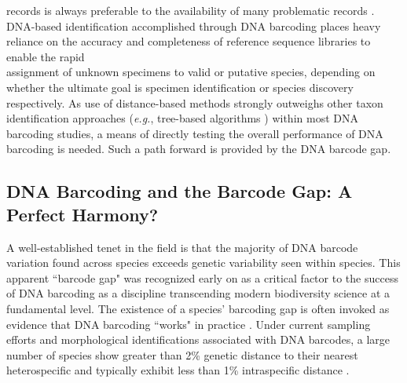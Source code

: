 records is always preferable to the availability of many problematic records \cite{collins2014known}. \\ DNA-based identification accomplished through DNA barcoding places heavy reliance on the accuracy and completeness of reference sequence libraries to enable the rapid \\ assignment of unknown specimens to valid or putative species, depending on whether the ultimate goal is specimen identification or species discovery respectively.  As use of distance-based methods strongly outweighs other taxon identification approaches (\textit{e.g.}, tree-based algorithms \cite{barbera2019epang}) within most DNA barcoding studies, a means of directly testing the overall performance of DNA barcoding is needed. Such a path forward is provided by the DNA barcode gap.  



\subsection{DNA Barcoding and the Barcode Gap: A Perfect Harmony?}

A well-established tenet in the field is that the majority of DNA barcode variation found across species exceeds genetic variability seen within species. This apparent ``barcode gap" \cite{meyer2005dna} was recognized early on as a critical factor to the success of DNA barcoding as a discipline transcending modern biodiversity science at a fundamental level. The existence of a species' barcoding gap is often invoked as evidence that DNA barcoding ``works" in practice \cite{stoeckle2014dna}. Under current sampling efforts and morphological identifications associated with DNA barcodes, a large number of species show greater than 2\% genetic distance to their nearest heterospecific and typically exhibit less than 1\% intraspecific distance \cite{hubert2015dna}. 



